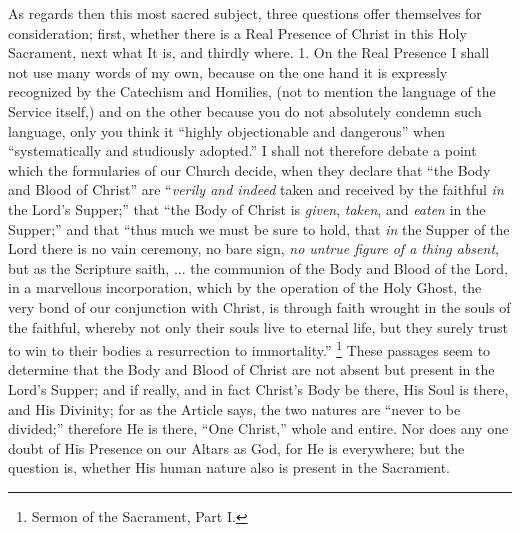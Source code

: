 As regards then this most sacred subject, three
questions offer themselves for consideration; first, whether there is
a Real Presence of Christ in this Holy Sacrament, next what It is, and
thirdly where. 1. On the Real Presence I shall not use many words of
my own, because on the one hand it is expressly recognized by the
Catechism and Homilies, (not to mention the language of the Service
itself,) and on the other because you do not absolutely condemn such
language, only you think it ``highly objectionable and dangerous''
when ``systematically and studiously adopted.'' I shall not therefore
debate a point which the formularies of our Church decide, when they
declare that ``the Body and Blood of Christ'' are ``\emph{verily and indeed}
taken and received by the faithful \emph{in} the Lord's Supper;'' that ``the
Body of Christ is \emph{given}, \emph{taken}, and \emph{eaten} in the
Supper;'' and that ``thus much we must be sure to hold, that \emph{in}
the Supper of the Lord there is no vain ceremony, no bare sign, \emph{no
untrue figure of a thing absent}, but as the Scripture saith, ...
the communion of the Body and Blood of the Lord, in a marvellous
incorporation, which by the operation of the Holy Ghost, the very bond
of our conjunction with Christ, is through faith wrought in the souls
of the faithful, whereby not only their souls live to eternal life,
but they surely trust to win to their bodies a resurrection to
immortality.'' \footnote{Sermon of the Sacrament, Part I.} These
passages seem to determine that the Body and Blood of Christ are not
absent but present in the Lord's Supper; and if really, and in fact
Christ's Body be there, His Soul is there, and His Divinity; for as
the Article says, the two natures are ``never to be divided;'' therefore
He is there, ``One Christ,'' whole and entire. Nor does any one doubt of
His Presence on our Altars as God, for He is everywhere; but the
question is, whether His human nature also is present in the
Sacrament.


